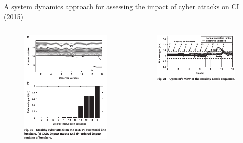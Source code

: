 \documentclass[compress]{beamer}
\begin{document}
\begin{frame}{A system dynamics approach for assessing the impact of cyber attacks on CI (2015)}
    \begin{columns}
     \begin{column}{0.4\textwidth}
      \begin{figure}
      \centering
      \includegraphics[width=1.0\textwidth]{./images/caia-impact-stealthy.png}
      \label{fig:ieee-14-bus}
      \end{figure}
     \end{column}
     \begin{column}{0.6\textwidth}
      \begin{figure}
      \centering
      \includegraphics[width=1.0\textwidth]{./images/stealthy-operator-view.png}

\end{figure}
\end{column}
\end{columns}
\end{frame}
\end{document}
